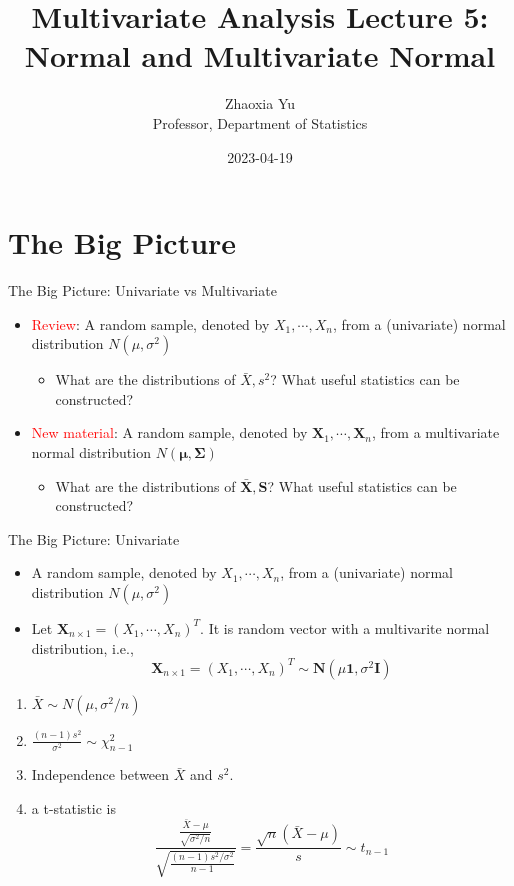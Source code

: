 \documentclass[
  ignorenonframetext,
]{beamer}
\title{Multivariate Analysis Lecture 5: Normal and Multivariate Normal}
\author{Zhaoxia Yu\\
Professor, Department of Statistics}
\date{2023-04-19}
\providecommand{\tightlist}{%
  \setlength{\itemsep}{0pt}\setlength{\parskip}{0pt}}
\begin{document}
\frame{\titlepage}

\hypertarget{the-big-picture}{%
\section{The Big Picture}\label{the-big-picture}}

\begin{frame}{The Big Picture: Univariate vs Multivariate}
\protect\hypertarget{the-big-picture-univariate-vs-multivariate}{}
\begin{itemize}
\tightlist
\item
  \textcolor{red}{Review}: A random sample, denoted by
  \(X_1, \cdots, X_n\), from a (univariate) normal distribution
  \(N(\mu, \sigma^2)\)

  \begin{itemize}
  \tightlist
  \item
    What are the distributions of \(\bar X, s^2\)? What useful
    statistics can be constructed?
  \end{itemize}
\item
  \textcolor{red}{New material}: A random sample, denoted by
  \(\mathbf X_1, \cdots, \mathbf X_n\), from a multivariate normal
  distribution \(N(\boldsymbol \mu, \boldsymbol \Sigma)\)

  \begin{itemize}
  \tightlist
  \item
    What are the distributions of \(\bar{\mathbf X}, \mathbf S\)? What
    useful statistics can be constructed?
  \end{itemize}
\end{itemize}
\end{frame}

\begin{frame}{The Big Picture: Univariate}
\protect\hypertarget{the-big-picture-univariate}{}
\begin{itemize}
\tightlist
\item
  A random sample, denoted by \(X_1, \cdots, X_n\), from a (univariate)
  normal distribution \(N(\mu, \sigma^2)\)
\item
  Let \(\mathbf X_{n\times 1}=(X_1, \cdots, X_n)^T\). It is random
  vector with a multivarite normal distribution, i.e.,
  \[\mathbf X_{n\times 1}=(X_1, \cdots, X_n)^T \sim \mathbf N(\mu\mathbf 1, \sigma^2\mathbf I)\]
\end{itemize}

\begin{enumerate}
\tightlist
\item
  \(\bar X \sim N(\mu, \sigma^2/n)\)
\item
  \(\frac{(n-1)s^2}{\sigma^2} \sim \chi_{n-1}^2\)
\item
  Independence between \(\bar X\) and \(s^2\).
\item
  a t-statistic is
  \[\frac{\frac{\bar X-\mu}{\sqrt{\sigma^2/n}}}{\sqrt{\frac{(n-1)s^2/\sigma^2}{n-1}}}=\frac{\sqrt{n}(\bar X-\mu)}{s} \sim t_{n-1}\]
\end{enumerate}
\end{frame}
\end{document}
